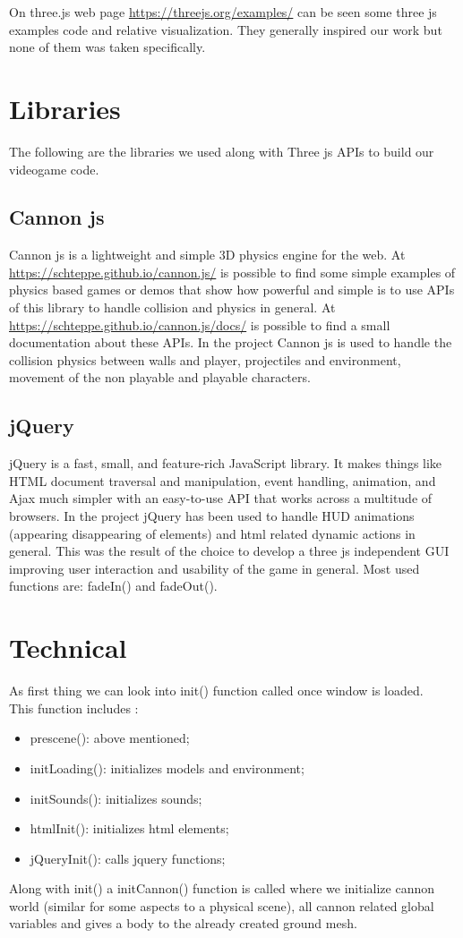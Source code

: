 \documentclass[14pt]{extarticle}
\begin{document}
On three.js web page \url{https://threejs.org/examples/} can be seen some three js examples code and relative visualization. They generally inspired our work but none of them was taken specifically.

\section{Libraries}
The following are the libraries we used along with Three js APIs to build our videogame code.
\subsection{Cannon js}
Cannon js is a lightweight and simple 3D physics engine for the web. At \url{https://schteppe.github.io/cannon.js/} is possible to find some simple examples of physics based games or demos that show how powerful and simple is to use APIs of this library to handle collision and physics in general.
At \url{https://schteppe.github.io/cannon.js/docs/} is possible to find a small documentation about these APIs.
In the project Cannon js is used to handle the collision physics between walls and player, projectiles and environment, movement of the non playable and playable characters.

\subsection{jQuery}

jQuery is a fast, small, and feature-rich JavaScript library. It makes things like HTML document traversal and manipulation, event handling, animation, and Ajax much simpler with an easy-to-use API that works across a multitude of browsers. 
In the project jQuery has been used to handle HUD animations (appearing disappearing of elements) and html related dynamic actions in general. This was the result of the choice to develop a three js independent GUI improving user interaction and usability of the game in general.
Most used functions are: fadeIn() and fadeOut().



\section { Technical }

As first thing we can look into init() function called once window is loaded. \\
This function includes :
\begin{itemize}
\item prescene(): above mentioned;
\item initLoading(): initializes models and environment;
\item initSounds(): initializes sounds;
\item htmlInit(): initializes html elements;
\item jQueryInit(): calls jquery functions;
\end{itemize}
Along with init() a initCannon() function is called where we initialize cannon world (similar for some aspects to a physical scene), all cannon related global variables and gives a body to the already created ground mesh. 
\end{document}

